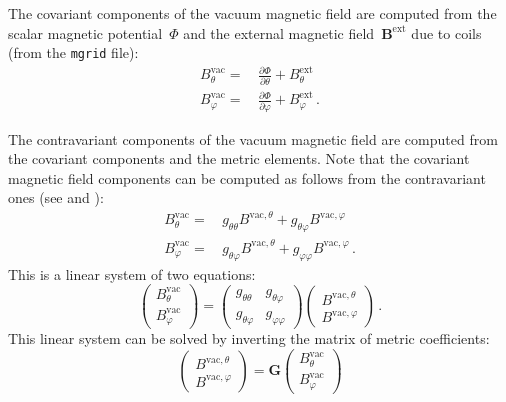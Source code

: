 The covariant components of the vacuum magnetic field
are computed from the scalar magnetic potential~$\Phi$
and the external magnetic field~$\mathbf{B}^{\textrm{ext}}$ due to coils (from the \texttt{mgrid} file):
\begin{align}
 B^{\textrm{vac}}_\theta  =&\, \frac{\partial \Phi}{\partial \theta } + B^\textrm{ext}_\theta  \\
 B^{\textrm{vac}}_\varphi =&\, \frac{\partial \Phi}{\partial \varphi} + B^\textrm{ext}_\varphi \, .
\end{align}

The contravariant components of the vacuum magnetic field
are computed from the covariant components and the metric elements.
Note that the covariant magnetic field components
can be computed as follows from the contravariant ones
(see  and ):
\begin{align}
  B^{\textrm{vac}}_\theta  =&\, g_{\theta \theta } B^{\textrm{vac},\theta} + g_{\theta  \varphi} B^{\textrm{vac},\varphi} \\
  B^{\textrm{vac}}_\varphi =&\, g_{\theta \varphi} B^{\textrm{vac},\theta} + g_{\varphi \varphi} B^{\textrm{vac},\varphi} \, .
\end{align}
This is a linear system of two equations:
\begin{equation}
  \begin{pmatrix}
    B^{\textrm{vac}}_\theta \\
    B^{\textrm{vac}}_\varphi
  \end{pmatrix}
  =
  \begin{pmatrix}
    g_{\theta \theta } & g_{\theta  \varphi} \\
    g_{\theta \varphi} & g_{\varphi \varphi}
  \end{pmatrix}
  \begin{pmatrix}
    B^{\textrm{vac},\theta } \\
    B^{\textrm{vac},\varphi}
  \end{pmatrix} \, .
\end{equation}
This linear system can be solved by inverting the matrix of metric coefficients:
\begin{equation}
  \begin{pmatrix}
    B^{\textrm{vac},\theta } \\
    B^{\textrm{vac},\varphi}
  \end{pmatrix}
  =
  \mathbf{G}
  \begin{pmatrix}
    B^{\textrm{vac}}_\theta \\
    B^{\textrm{vac}}_\varphi
  \end{pmatrix}
\end{equation}
